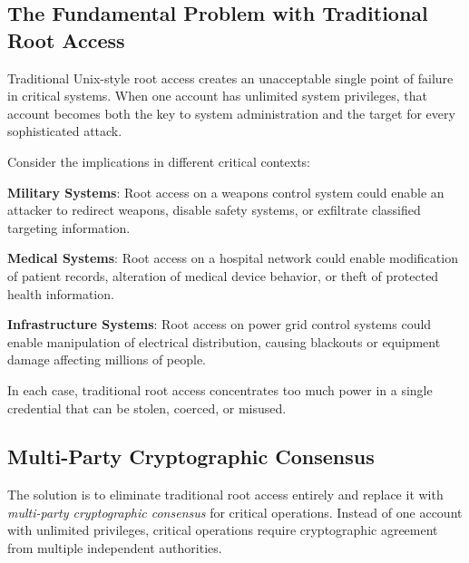 \subsection{The Fundamental Problem with Traditional Root Access}

Traditional Unix-style root access creates an unacceptable single point of failure in critical systems. When one account has unlimited system privileges, that account becomes both the key to system administration and the target for every sophisticated attack.

Consider the implications in different critical contexts:

\textbf{Military Systems}: Root access on a weapons control system could enable an attacker to redirect weapons, disable safety systems, or exfiltrate classified targeting information.

\textbf{Medical Systems}: Root access on a hospital network could enable modification of patient records, alteration of medical device behavior, or theft of protected health information.

\textbf{Infrastructure Systems}: Root access on power grid control systems could enable manipulation of electrical distribution, causing blackouts or equipment damage affecting millions of people.

In each case, traditional root access concentrates too much power in a single credential that can be stolen, coerced, or misused.

\subsection{Multi-Party Cryptographic Consensus}

The solution is to eliminate traditional root access entirely and replace it with \textit{multi-party cryptographic consensus} for critical operations. Instead of one account with unlimited privileges, critical operations require cryptographic agreement from multiple independent authorities.

